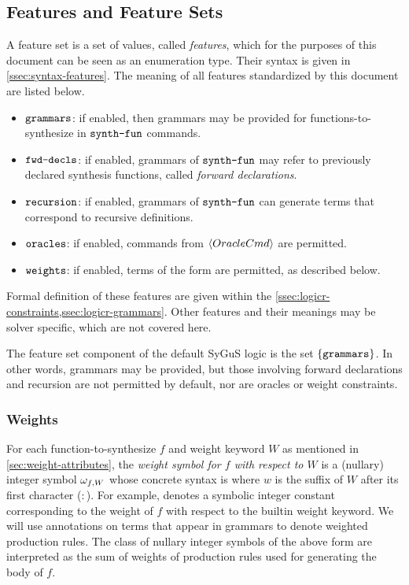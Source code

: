 \documentclass[english,a4paper,10pt]{article}
\begin{document}
\subsection{Features and Feature Sets}
\label{ssec:feature-sets}

A feature set is a set of values, called \emph{features},
which for the purposes of this document can be seen as an enumeration type.
Their syntax is given in \cref{ssec:syntax-features}.
The meaning of all features standardized by this document are listed below.
\begin{itemize}
\item $\texttt{grammars}$: if enabled, 
then grammars may be provided for functions-to-synthesize 
in $\texttt{synth-fun}$ commands.
\item $\texttt{fwd-decls}$: if enabled,
grammars of $\texttt{synth-fun}$ may refer to previously declared synthesis functions,
called \emph{forward declarations}.
\item $\texttt{recursion}$: if enabled,
grammars of $\texttt{synth-fun}$ can generate terms that correspond to recursive definitions.
\item $\texttt{oracles}$: if enabled,
commands from $\left\langle OracleCmd\right\rangle$ are permitted.
\item $\texttt{weights}$: if enabled,
terms of the form  are permitted,
as described below.
\end{itemize}
Formal definition of these features are given within the 
\cref{ssec:logicr-constraints,ssec:logicr-grammars}.
Other features and their meanings may be solver specific, 
which are not covered here.

The feature set component of the default SyGuS logic is the set $\{ \texttt{grammars} \}$.
In other words, grammars may be provided, but those involving
forward declarations and recursion are not permitted by default,
nor are oracles or weight constraints.

\subsubsection{Weights}
\label{sec:weight-semantics}
For each function-to-synthesize $f$ and weight keyword $W$
as mentioned in \cref{sec:weight-attributes},
the \emph{weight symbol for $f$ with respect to $W$} is a (nullary) integer symbol $\omega_{f,W}$
whose concrete syntax is  where $w$ is the
suffix of $W$ after its first character ($:$).
For example, 
denotes a symbolic integer constant corresponding to the weight of $f$
with respect to the builtin weight keyword.
We will use annotations on terms that appear in grammars
to denote weighted production rules.
The class of nullary integer symbols of the above form are
interpreted as the sum of weights of production rules used for generating the body of $f$.
\end{document}
